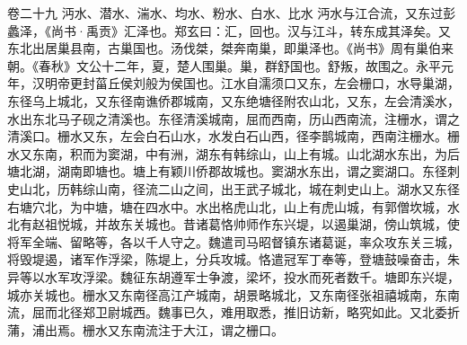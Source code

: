 \documentclass[12pt,UTF8]{ctexbook}
\begin{document}
卷二十九  沔水、潜水、湍水、均水、粉水、白水、比水 
沔水与江合流，又东过彭蠡泽，《尚书·禹贡》汇泽也。郑玄曰：汇，回也。汉与江斗，转东成其泽矣。又东北出居巢县南，古巢国也。汤伐桀，桀奔南巢，即巢泽也。《尚书》周有巢伯来朝。《春秋》文公十二年，夏，楚人围巢。巢，群舒国也。舒叛，故围之。永平元年，汉明帝更封菑丘侯刘般为侯国也。江水自濡须口又东，左会栅口，水导巢湖，东径乌上城北，又东径南谯侨郡城南，又东绝塘径附农山北，又东，左会清溪水，水出东北马子砚之清溪也。东径清溪城南，屈而西南，历山西南流，注栅水，谓之清溪口。栅水又东，左会白石山水，水发白石山西，径李鹊城南，西南注栅水。栅水又东南，积而为窦湖，中有洲，湖东有韩综山，山上有城。山北湖水东出，为后塘北湖，湖南即塘也。塘上有颖川侨郡故城也。窦湖水东出，谓之窦湖口。东径刺史山北，历韩综山南，径流二山之间，出王武子城北，城在刺史山上。湖水又东径右塘穴北，为中塘，塘在四水中。水出格虎山北，山上有虎山城，有郭僧坎城，水北有赵祖悦城，并故东关城也。昔诸葛恪帅师作东兴堤，以遏巢湖，傍山筑城，使将军全端、留略等，各以千人守之。魏遣司马昭督镇东诸葛诞，率众攻东关三城，将毁堤遏，诸军作浮梁，陈堤上，分兵攻城。恪遣冠军丁奉等，登塘鼓噪奋击，朱异等以水军攻浮梁。魏征东胡遵军士争渡，梁坏，投水而死者数千。塘即东兴堤，城亦关城也。栅水又东南径高江产城南，胡景略城北，又东南径张祖禧城南，东南流，屈而北径郑卫尉城西。魏事已久，难用取悉，推旧访新，略究如此。又北委折蒲，浦出焉。栅水又东南流注于大江，谓之栅口。
\end{document}
